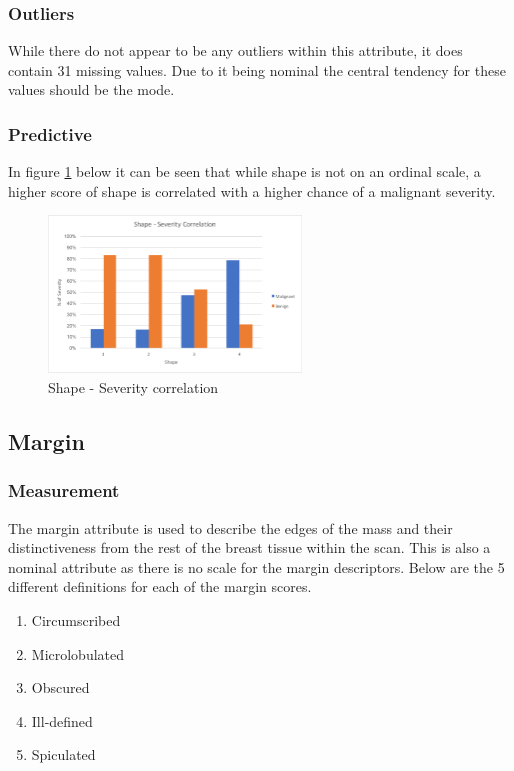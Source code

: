 \documentclass[12pt]{article}
\begin{document}
      \subsubsection{Outliers}
        While there do not appear to be any outliers within this attribute, it does contain 31 missing values. Due to it being nominal the central tendency for these values should be the mode.

      \subsubsection{Predictive}
        In figure \ref{fig:shape-severity-correlation} below it can be seen that while shape is not on an ordinal scale, a higher score of shape is correlated with a higher chance of a malignant severity.

        \begin{figure}[H]
          \centering
          \includegraphics[width=0.6\textwidth]{shape-severity-correlation}
          \caption{Shape - Severity correlation}
          \label{fig:shape-severity-correlation}
        \end{figure}

    \subsection{Margin}
      \subsubsection{Measurement}
        The margin attribute is used to describe the edges of the mass and their distinctiveness from the rest of the breast tissue within the scan. This is also a nominal attribute as there is no scale for the margin descriptors. Below are the 5 different definitions for each of the margin scores.

        \begin{enumerate}[label=\arabic*)]
          \item Circumscribed
          \item Microlobulated
          \item Obscured
          \item Ill-defined
          \item Spiculated
        \end{enumerate}
\end{document}
